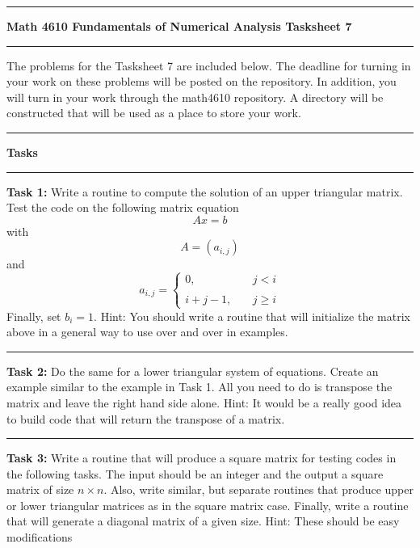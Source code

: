\documentclass[10pt,fleqn]{article}
\begin{document}
\vskip0.1in\hrule\vskip0.1in \noindent
{\bf{\Large Math 4610 Fundamentals of Numerical Analysis Tasksheet 7}}
\vskip0.1in\hrule\vskip0.1in \noindent
The problems for the Tasksheet 7 are included below. The deadline for turning
in your work on these problems will be posted on the repository. In addition,
you will turn in your work through the math4610 repository. A directory will be
constructed that will be used as a place to store your work.
\vskip0.1in\hrule\vskip0.1in \noindent
{\bf{\large Tasks}}
\vskip0.1in\hrule\vskip0.1in \noindent
\begin{trivlist}
  \item[\bf Task 1:] Write a routine to compute the solution of an upper
      triangular matrix. Test the code on the following matrix equation
         \[
            A x = b
         \]
         with
         \[
           A = (a_{i,j})
         \]
         and
         \[
           a_{i,j} = \left\lbrace
                       \begin{array}{rcl}
                         0,     & \ & j < i \\
                         \      & \ &       \\
                         i+j-1, & \ & j \geq i
                       \end{array}
                     \right.
         \]
         Finally, set \(b_i=1\).
         Hint: You should write a routine that will initialize the matrix above
         in a general way to use over and over in examples.
\vskip0.1in\hrule\vskip0.1in \noindent
  \item[\bf Task 2:] Do the same for a lower triangular system of equations.
      Create an example similar to the example in Task 1. All you need to do is
      transpose the matrix and leave the right hand side alone. Hint: It would
      be a really good idea to build code that will return the transpose of a
      matrix.
\vskip0.1in\hrule\vskip0.1in \noindent
  \item[\bf Task 3:] Write a routine that will produce a square matrix for
      testing codes in the following tasks. The input should be an integer and
      the output a square matrix of size \(n\times n\). Also, write similar,
      but separate routines that produce upper or lower triangular matrices as
      in the square matrix case. Finally, write a routine that will generate a
      diagonal matrix of a given size. Hint: These should be easy modifications

\end{trivlist}
\end{document}
